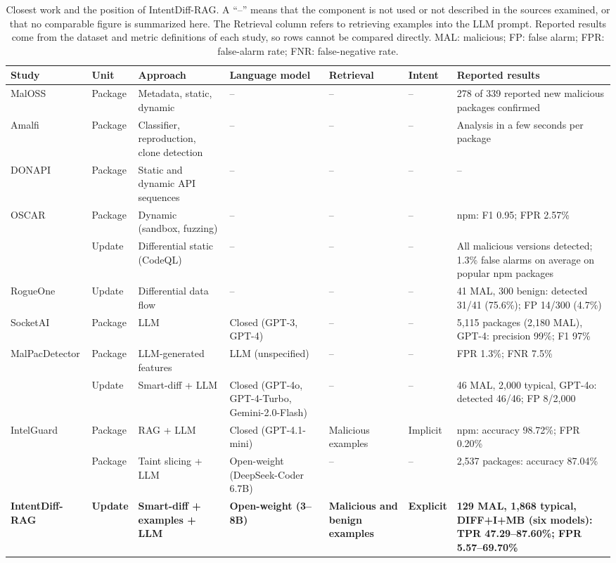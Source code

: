 \documentclass[a4paper,fleqn]{cas-dc}
\begin{document}
\begin{table}[t]
\centering\small
\setlength{\tabcolsep}{4pt}
\caption{Closest work and the position of IntentDiff-RAG. A ``--'' means that
the component is not used or not described in the sources examined, or that no
comparable figure is summarized here. The Retrieval column refers to
retrieving examples into the LLM prompt. Reported results come from the
dataset and metric definitions of each study, so rows cannot be compared
directly. MAL: malicious; FP: false alarm; FPR: false-alarm rate; FNR:
false-negative rate.}
\label{tab:related}
\begin{tabularx}{\textwidth}{L{2.55cm} L{1.25cm} L{2.65cm} L{2.75cm} L{1.8cm} L{1.35cm} Y}
\toprule
Study & Unit & Approach & Language model & Retrieval & Intent & Reported results \\
\midrule
MalOSS \citep{duan2021towards} & Package & Metadata, static, dynamic & -- & -- & -- & 278 of 339 reported new malicious packages confirmed \\
Amalfi \citep{sejfia2022practical} & Package & Classifier, reproduction, clone detection & -- & -- & -- & Analysis in a few seconds per package \\
DONAPI \citep{huang2024donapi} & Package & Static and dynamic API sequences & -- & -- & -- & -- \\
OSCAR \citep{zheng2024towards} & Package & Dynamic (sandbox, fuzzing) & -- & -- & -- & npm: F1 0.95; FPR 2.57\% \\
\citet{froh2023differential} & Update & Differential static (CodeQL) & -- & -- & -- & All malicious versions detected; 1.3\% false alarms on average on popular npm packages \\
RogueOne \citep{sofaer2024rogueone} & Update & Differential data flow & -- & -- & -- & 41 MAL, 300 benign: detected 31/41 (75.6\%); FP 14/300 (4.7\%) \\
SocketAI \citep{zahan2025leveraging} & Package & LLM & Closed (GPT-3, GPT-4) & -- & -- & 5,115 packages (2,180 MAL), GPT-4: precision 99\%; F1 97\% \\
MalPacDetector \citep{wang2025malpacdetector} & Package & LLM-generated features & LLM (unspecified) & -- & -- & FPR 1.3\%; FNR 7.5\% \\
\citet{wyss2025evaluating} & Update & Smart-diff + LLM & Closed (GPT-4o, GPT-4-Turbo, Gemini-2.0-Flash) & -- & -- & 46 MAL, 2,000 typical, GPT-4o: detected 46/46; FP 8/2,000 \\
IntelGuard \citep{guo2026bridging} & Package & RAG + LLM & Closed (GPT-4.1-mini) & Malicious examples & Implicit & npm: accuracy 98.72\%; FPR 0.20\% \\
\citet{nguyen2025taint} & Package & Taint slicing + LLM & Open-weight (DeepSeek-Coder 6.7B) & -- & -- & 2,537 packages: accuracy 87.04\% \\
\midrule
\textbf{IntentDiff-RAG} & \textbf{Update} & \textbf{Smart-diff + examples + LLM} & \textbf{Open-weight (3--8B)} & \textbf{Malicious and benign examples} & \textbf{Explicit} & \textbf{129 MAL, 1,868 typical, DIFF+I+MB (six models): TPR 47.29--87.60\%; FPR 5.57--69.70\%} \\
\bottomrule
\end{tabularx}
\end{table}
\end{document}
